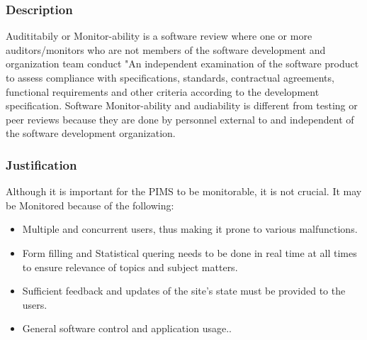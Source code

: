 	\subsubsection*{Description}
		Audititabily or Monitor-ability is a software review where one or more auditors/monitors who are not members of the software development and organization team conduct "An independent examination of the software product to assess compliance with specifications, standards, contractual agreements, functional requirements and other criteria according to the development specification. Software Monitor-ability and audiability is different from testing or peer reviews because they are done by personnel external to and independent of the software development organization.
	\subsubsection*{Justification}
	Although it is important for the PIMS to be monitorable, it is not crucial. It may be Monitored because of the following:
					\begin{itemize}
							\item Multiple and concurrent users, thus making it prone to various malfunctions.
							
							\item Form filling and Statistical quering needs to be done in real time at all times to ensure relevance of topics and subject matters.
							
							\item Sufficient feedback and updates of the site's state must be provided to the users.
							
							\item General software control and application usage..
						 \end{itemize}
	
